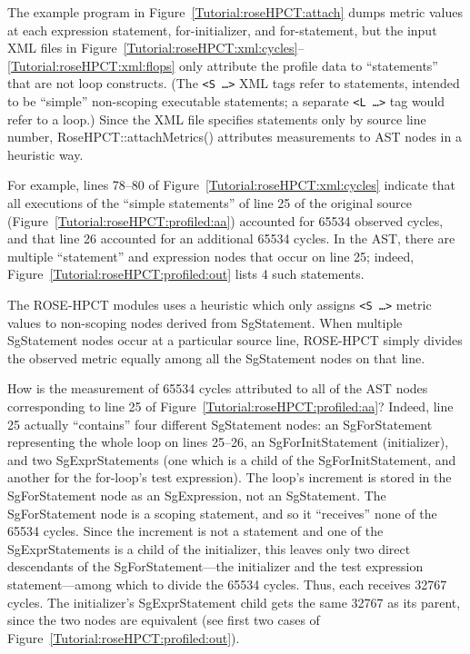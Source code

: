 The example program in Figure~\ref{Tutorial:roseHPCT:attach} dumps
metric values at each expression statement, for-initializer, and
for-statement, but the input XML files in
Figure~\ref{Tutorial:roseHPCT:xml:cycles}--\ref{Tutorial:roseHPCT:xml:flops}
only attribute the profile data to ``statements'' that are not loop
constructs. (The \texttt{<S \ldots>} XML tags refer to statements,
intended to be ``simple'' non-scoping executable statements; a
separate \texttt{<L \ldots>} tag would refer to a loop.) Since the XML
file specifies statements only by source line number,
RoseHPCT::attachMetrics() attributes measurements to AST nodes in a
heuristic way.

For example, lines 78--80 of Figure~\ref{Tutorial:roseHPCT:xml:cycles}
indicate that all executions of the ``simple statements'' of line 25
of the original source (Figure~\ref{Tutorial:roseHPCT:profiled:aa})
accounted for 65534 observed cycles, and that line 26 accounted for an
additional 65534 cycles. In the AST, there are multiple ``statement''
and expression nodes that occur on line 25; indeed,
Figure~\ref{Tutorial:roseHPCT:profiled:out} lists 4 such
statements.

The ROSE-HPCT modules uses a heuristic which only assigns \texttt{<S
\ldots>} metric values to non-scoping nodes derived from
SgStatement. When multiple SgStatement nodes occur at a particular
source line, ROSE-HPCT simply divides the observed metric equally
among all the SgStatement nodes on that line.

How is the measurement of 65534 cycles attributed to all of the AST
nodes corresponding to line 25 of
Figure~\ref{Tutorial:roseHPCT:profiled:aa}? Indeed, line 25 actually
``contains'' four different SgStatement nodes: an SgForStatement
representing the whole loop on lines 25--26, an SgForInitStatement
(initializer), and two SgExprStatements (one which is a child of the
SgForInitStatement, and another for the for-loop's test
expression). The loop's increment is stored in the SgForStatement node
as an SgExpression, not an SgStatement. The SgForStatement node is a
scoping statement, and so it ``receives'' none of the 65534
cycles. Since the increment is not a statement and one of the
SgExprStatements is a child of the initializer, this leaves only two
direct descendants of the SgForStatement---the initializer and the
test expression statement---among which to divide the 65534
cycles. Thus, each receives 32767 cycles. The initializer's
SgExprStatement child gets the same 32767 as its parent, since the two
nodes are equivalent (see first two cases of
Figure~\ref{Tutorial:roseHPCT:profiled:out}).

